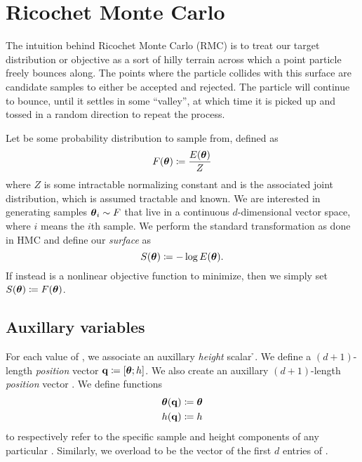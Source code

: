 \section{Ricochet Monte Carlo} \label{s:rmc}

The intuition behind Ricochet Monte Carlo (RMC) is to treat our target
distribution or objective as a sort of hilly terrain across which a point
particle freely bounces along. The points where the particle collides with this
surface are candidate samples to either be accepted and rejected. The particle
will continue to bounce, until it settles in some ``valley'', at which time it is
picked up and tossed in a random direction to repeat the process.

Let \target{} be some probability distribution to sample from, defined as
\begin{equation*}
    F(\boldsymbol{\theta}){} \coloneqq \frac{E(\boldsymbol{\theta}){}}{Z}
\end{equation*}
where $Z$ is some intractable normalizing constant and \energy{} is the
associated joint distribution, which is assumed tractable and known. We are
interested in generating samples $\boldsymbol{\theta}_i{} \sim F$ that live in a continuous
$d$-dimensional vector space, where $i$ means the $i$th sample. We perform the
standard transformation as done in HMC and define our \emph{surface} as
\begin{equation*}
    \label{eq:surface}
    S(\boldsymbol{\theta}){} \coloneqq - \log E(\boldsymbol{\theta}){}.
\end{equation*}
If instead \target{} is a nonlinear objective function to minimize, then we
simply set $S(\boldsymbol{\theta}){} \coloneqq F(\boldsymbol{\theta}){}$.

\subsection{Auxillary variables} \label{ss:auxillary}

For each value of \thetab{}, we associate an auxillary \emph{height} scalar
\h{}. We define a $(d+1)$-length \emph{position} vector $\mathbf{q}{} \coloneqq
[\boldsymbol{\theta}{}; h{}]$. We also create an auxillary $(d+1)$-length \emph{position}
vector \p{}. We define functions
\begin{align*}
    \boldsymbol{\theta}(\mathbf{q}{}) &\coloneqq  \boldsymbol{\theta}{} \\
    h(\mathbf{q}{})     &\coloneqq  h{}
\end{align*}
to respectively refer to the specific sample and height components of any
particular \q{}. Similarly, we overload \thetaof{\p{}} to be the vector of the
first $d$ entries of \p{}.

